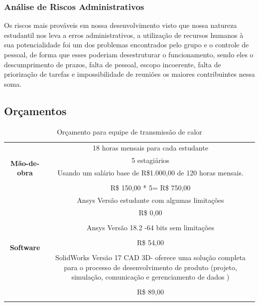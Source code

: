 \subsubsection{Análise de Riscos Administrativos}
Os riscos mais prováveis em nossa desenvolvimento visto que nossa natureza estudantil nos leva a erros administrativos, a utilização de recursos humanos à sua potencialidade foi um dos problemas encontrados pelo grupo e o controle de pessoal, de forma que esses poderiam desestruturar o funcionamento, sendo eles o descumprimento de prazos, falta de pessoal, escopo incoerente, falta de priorização de tarefas  e impossibilidade de reuniões os maiores contribuintes nessa soma.
\subsection{Orçamentos}
\begin{table}[htbp]
	\centering
	\caption{Orçamento para equipe de transmissão de calor}
	\begin{tabular}{|c|c|}
		\toprule
		\multicolumn{1}{|c|}{\multirow{5}[2]{*}{\textbf{Mão-de-obra }}} & \multicolumn{1}{p{16.715em}|}{18 horas mensais para cada estudante} \\
		& \multicolumn{1}{p{16.715em}|}{5 estagiários } \\
		& \multicolumn{1}{p{16.715em}|}{ Usando um salário base de R\$1.000,00 de 120 horas mensais.} \\
		&  \\
		& \multicolumn{1}{p{16.715em}|}{R\$ 150,00 * 5= R\$ 750,00 } \\
		\midrule
		\multicolumn{1}{|c|}{\multirow{11}[2]{*}{\textbf{Software}}} & \multicolumn{1}{p{16.715em}|}{ Ansys Versão estudante com algumas limitações} \\
		& R\$ 0,00 \\
		&  \\
		& \multicolumn{1}{p{16.715em}|}{Ansys Versão 18.2 -64 bits sem limitações} \\
		&  \\
		& R\$ 54,00 \\
		&  \\
		& \multicolumn{1}{p{16.715em}|}{ SolidWorks Versão 17 CAD 3D- oferece uma solução completa para o processo de desenvolvimento de produto (projeto, simulação, comunicação e gerenciamento de dados )} \\
		&  \\
		& R\$ 89,00 \\
		&  \\
		\bottomrule
	\end{tabular}%
	\label{tabBtc}
\end{table}
\newpage


